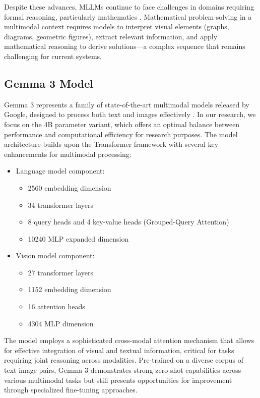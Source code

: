 \documentclass[11pt,a4paper]{article}
\begin{document}
Despite these advances, MLLMs continue to face challenges in domains requiring formal reasoning, particularly mathematics \cite{yue2023mammoth, lu2023mathvista}. Mathematical problem-solving in a multimodal context requires models to interpret visual elements (graphs, diagrams, geometric figures), extract relevant information, and apply mathematical reasoning to derive solutions—a complex sequence that remains challenging for current systems.

\subsection{Gemma 3 Model}

Gemma 3 represents a family of state-of-the-art multimodal models released by Google, designed to process both text and images effectively \cite{gemma3paper}. In our research, we focus on the 4B parameter variant, which offers an optimal balance between performance and computational efficiency for research purposes. The model architecture builds upon the Transformer framework with several key enhancements for multimodal processing:

\begin{itemize}
    \item Language model component:
    \begin{itemize}
        \item 2560 embedding dimension
        \item 34 transformer layers
        \item 8 query heads and 4 key-value heads (Grouped-Query Attention)
        \item 10240 MLP expanded dimension
    \end{itemize}
    \item Vision model component:
    \begin{itemize}
        \item 27 transformer layers
        \item 1152 embedding dimension
        \item 16 attention heads
        \item 4304 MLP dimension
    \end{itemize}
\end{itemize}

The model employs a sophisticated cross-modal attention mechanism that allows for effective integration of visual and textual information, critical for tasks requiring joint reasoning across modalities. Pre-trained on a diverse corpus of text-image pairs, Gemma 3 demonstrates strong zero-shot capabilities across various multimodal tasks but still presents opportunities for improvement through specialized fine-tuning approaches.
\end{document}

